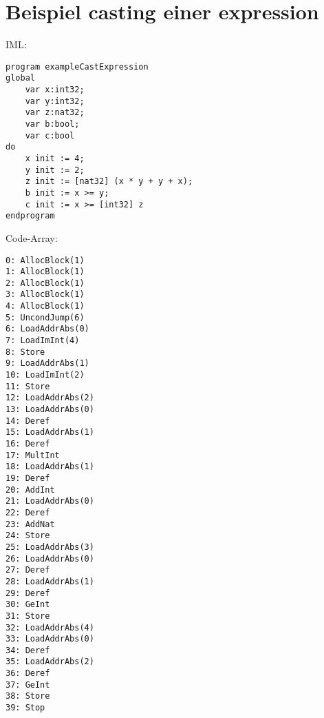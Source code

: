 \documentclass[10pt, a4paper, twocolumn]{article} %
\begin{document}
\clearpage
\section{Beispiel casting einer expression}
\label{bsp_casting_expr}
IML:
\begin{lstlisting}
program exampleCastExpression
global
    var x:int32;
    var y:int32;
    var z:nat32;
    var b:bool;
    var c:bool
do
    x init := 4;
    y init := 2;
    z init := [nat32] (x * y + y + x);
    b init := x >= y;
    c init := x >= [int32] z
endprogram
\end{lstlisting}


Code-Array:
\begin{lstlisting}
0: AllocBlock(1)
1: AllocBlock(1)
2: AllocBlock(1)
3: AllocBlock(1)
4: AllocBlock(1)
5: UncondJump(6)
6: LoadAddrAbs(0)
7: LoadImInt(4)
8: Store
9: LoadAddrAbs(1)
10: LoadImInt(2)
11: Store
12: LoadAddrAbs(2)
13: LoadAddrAbs(0)
14: Deref
15: LoadAddrAbs(1)
16: Deref
17: MultInt
18: LoadAddrAbs(1)
19: Deref
20: AddInt
21: LoadAddrAbs(0)
22: Deref
23: AddNat
24: Store
25: LoadAddrAbs(3)
26: LoadAddrAbs(0)
27: Deref
28: LoadAddrAbs(1)
29: Deref
30: GeInt
31: Store
32: LoadAddrAbs(4)
33: LoadAddrAbs(0)
34: Deref
35: LoadAddrAbs(2)
36: Deref
37: GeInt
38: Store
39: Stop
\end{lstlisting}
\end{document}
